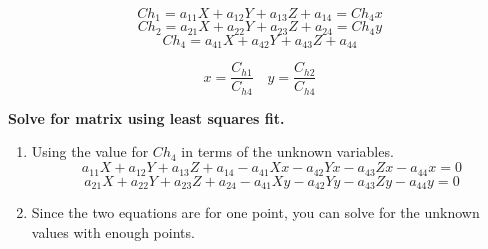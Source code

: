 \documentclass{article}
\begin{document}
\[Ch_1 = a_{11}X + a_{12}Y + a_{13}Z + a_{14} = Ch_4 x\]
\[Ch_2 = a_{21}X + a_{22}Y + a_{23}Z + a_{24} = Ch_4 y\]
\[Ch_4 = a_{41}X + a_{42}Y + a_{43}Z + a_{44}\]

\[x = \frac{C_{h1}}{C_{h4}} \quad y = \frac{C_{h2}}{C_{h4}}\]

\textbf{Solve for matrix using least squares fit.}

\begin{enumerate}
    \item Using the value for $Ch_4$ in terms of the unknown variables.
    \[a_{11}X + a_{12}Y + a_{13}Z + a_{14} - a_{41}Xx - a_{42}Yx - a_{43}Zx - a_{44}x = 0\]
    \[a_{21}X + a_{22}Y + a_{23}Z + a_{24} - a_{41}Xy - a_{42}Yy - a_{43}Zy - a_{44}y = 0\]
    \item Since the two equations are for one point, you can solve for the unknown values with enough points.
\end{enumerate}
\end{document}
